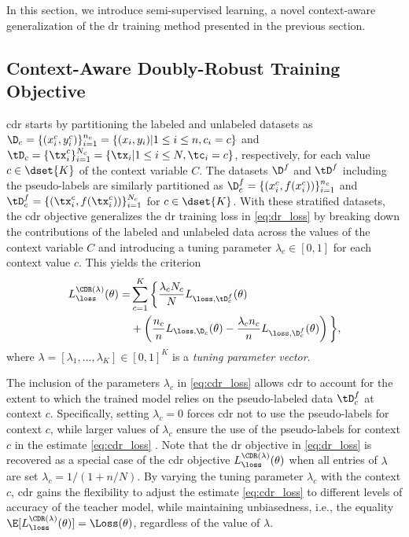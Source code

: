 \documentclass[journal]{IEEEtran}
\begin{document}
In this section, we introduce  semi-supervised learning, a novel context-aware generalization of the \gls{dr} training method presented in the previous section.

\subsection{Context-Aware Doubly-Robust Training Objective}

\gls{cdr} starts by partitioning the labeled and unlabeled datasets as $\D_c = \{(x^c_i, y^c_i)\}_{i=1}^{n_c} = \{ (x_i, y_i) | 1 \leq i \leq n, c_i = c \}$ and $\tD_c = \{ \tx^c_i \}_{i=1}^{N_c} = \{ \tx_i | 1 \leq i \leq N, \tc_i = c \}$, respectively, for each value $c \in \dset{K}$ of the context variable $C$.
The datasets $\D^f$ and $\tD^f$ including the pseudo-labels are similarly partitioned as $\D^f_c = \{ (x^c_i, f(x^c_i)) \}_{i=1}^{n_c}$ and $\tD^f_c = \{ (\tx^c_i, f(\tx^c_i)) \}_{i=1}^{N_c}$ for $c \in \dset{K}$.
With these stratified datasets, the \gls{cdr} objective generalizes the \gls{dr} training loss in \eqref{eq:dr_loss} by breaking down the contributions of the labeled and unlabeled data across the values of the context variable $C$ and introducing a tuning parameter $\lambda_c \in [0, 1]$ for each context value $c$.
This yields the criterion
\begin{equation}
\label{eq:cdr_loss}
\begin{split}
L^{\CDR(\lambda)}_{\loss}(\theta) = 
    &\sum_{c=1}^{K} \bigg\{
        \frac{\lambda_c N_c}{N} L_{\loss, \tD^f_c}(\theta) \\
        & + \left(
            \frac{n_c}{n} L_{\loss, \D_c}(\theta) -
            \frac{\lambda_c n_c}{n} L_{\loss, \D^f_c}(\theta)
        \right)
    \bigg\},
\end{split}
\end{equation}
where $\lambda = [\lambda_1, ..., \lambda_K] \in [0, 1]^K$ is a \emph{tuning parameter vector}.

The inclusion of the parameters $\lambda_c$ in \eqref{eq:cdr_loss} allows \gls{cdr} to account for the extent to which the trained model relies on the pseudo-labeled data $\tD^f_c$ at context $c$.
Specifically, setting $\lambda_c = 0$ forces \gls{cdr} not to use the pseudo-labels for context $c$, while larger values of $\lambda_c$ ensure the use of the pseudo-labels for context $c$ in the estimate \eqref{eq:cdr_loss} \cite{angelopoulos2023ppi}.
Note that the \gls{dr} objective in \eqref{eq:dr_loss} is recovered as a special case of the \gls{cdr} objective $L^{\CDR(\lambda)}_{\loss}(\theta)$ when all entries of $\lambda$ are set $\lambda_c = 1 / (1 + n / N)$.
By varying the tuning parameter $\lambda_c$ with the context $c$, \gls{cdr} gains the flexibility to adjust the estimate \eqref{eq:cdr_loss} to different levels of accuracy of the teacher model, while maintaining unbiasedness, i.e., the equality $\E[L^{\CDR(\lambda)}_{\loss}(\theta)] = \Loss(\theta)$, regardless of the value of $\lambda$.
\end{document}
